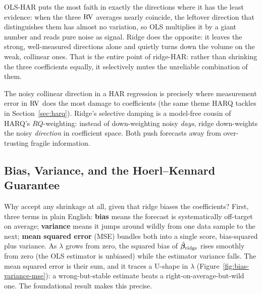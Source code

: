\begin{intuition}
OLS-HAR puts the most faith in exactly the directions where it has the least evidence: when the three $\operatorname{RV}$ averages nearly coincide, the leftover direction that distinguishes them has almost no variation, so OLS multiplies it by a giant number and reads pure noise as signal.
Ridge does the opposite: it leaves the strong, well-measured directions alone and quietly turns down the volume on the weak, collinear ones.
That is the entire point of ridge-HAR: rather than shrinking the three coefficients equally, it selectively mutes the unreliable combination of them.
\end{intuition}

\begin{projectconnection}
The noisy collinear direction in a HAR regression is precisely where measurement error in $\operatorname{RV}$ does the most damage to coefficients (the same theme HARQ tackles in Section~\ref{sec:harq}).
Ridge's selective damping is a model-free cousin of HARQ's $RQ$-weighting: instead of down-weighting noisy \emph{days}, ridge down-weights the noisy \emph{direction} in coefficient space.
Both push forecasts away from over-trusting fragile information.
\end{projectconnection}

\subsection{Bias, Variance, and the Hoerl--Kennard Guarantee}

Why accept any shrinkage at all, given that ridge biases the coefficients?
First, three terms in plain English: \textbf{bias} means the forecast is systematically off-target on average; \textbf{variance} means it jumps around wildly from one data sample to the next; \textbf{mean squared error} (MSE) bundles both into a single score, bias-squared plus variance.
As $\lambda$ grows from zero, the squared bias of $\hat{\bm{\beta}}_{\mathrm{ridge}}$ rises smoothly from zero (the OLS estimator is unbiased) while the estimator variance falls.
The mean squared error is their sum, and it traces a U-shape in $\lambda$ (Figure~\ref{fig:bias-variance-mse}): a wrong-but-stable estimate beats a right-on-average-but-wild one.
The foundational result makes this precise.

